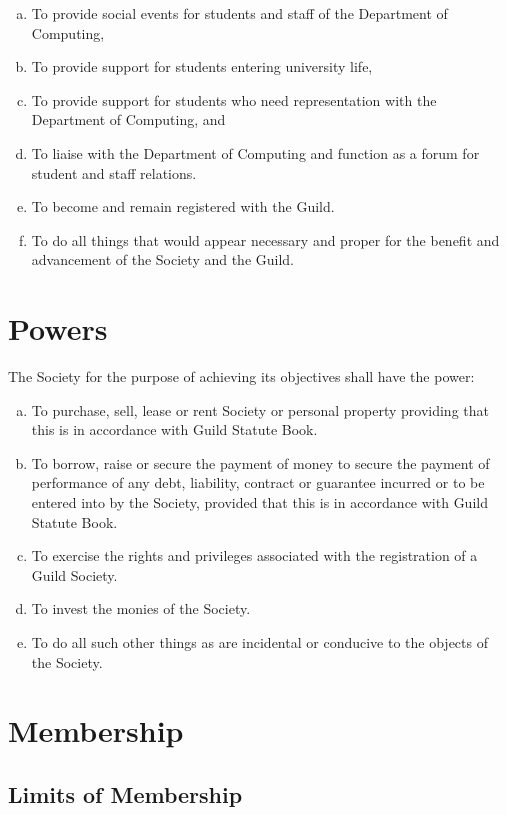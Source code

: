 \documentclass[a4paper,12pt]{article}
\begin{document}
\begin{enumerate}[a)]
	\item To provide social events for students and staff of the Department of Computing,
	\item To provide support for students entering university life,
	\item To provide support for students who need representation with the Department of Computing, and
	\item To liaise with the Department of Computing and function as a forum for student and staff relations.
	\item To become and remain registered with the Guild.
	\item To do all things that would appear necessary and proper for the benefit and advancement of the Society and the Guild.	
\end{enumerate}

\section{Powers}

The Society for the purpose of achieving its objectives shall have the power:

\begin{enumerate}[a)]
	\item To purchase, sell, lease or rent Society or personal property providing that this is in
accordance with Guild Statute Book.
	\item To borrow, raise or secure the payment of money to secure the payment of
performance of any debt, liability, contract or guarantee incurred or to be entered into
by the Society, provided that this is in accordance with Guild Statute Book.
	\item To exercise the rights and privileges associated with the registration of a Guild
Society.
	\item To invest the monies of the Society.
	\item To do all such other things as are incidental or conducive to the objects of the Society.
\end{enumerate}

\section{Membership}

\subsection{Limits of Membership}
\end{document}
